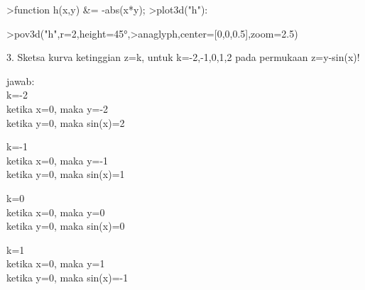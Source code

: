 \documentclass{article}
\begin{document}
\begin{eulernotebook}
\begin{eulercomment}
\begin{eulercomment}
\begin{eulercomment}
\begin{eulercomment}
\begin{eulercomment}
\begin{eulercomment}
\begin{eulerprompt}
\end{eulerprompt}
\begin{eulerprompt}
>function h(x,y) &= -abs(x*y);
>plot3d("h"):
\end{eulerprompt}
\begin{eulerprompt}
>pov3d("h",r=2,height=45°,>anaglyph,center=[0,0,0.5],zoom=2.5)
\end{eulerprompt}
\eulersubheading{}
\begin{eulercomment}
3. Sketsa kurva ketinggian z=k, untuk k=-2,-1,0,1,2 pada  permukaan
z=y-sin(x)!

jawab:\\
k=-2\\
ketika x=0, maka y=-2\\
ketika y=0, maka sin(x)=2

k=-1\\
ketika x=0, maka y=-1\\
ketika y=0, maka sin(x)=1

k=0\\
ketika x=0, maka y=0\\
ketika y=0, maka sin(x)=0

k=1\\
ketika x=0, maka y=1\\
ketika y=0, maka sin(x)=-1


\end{eulercomment}
\end{eulercomment}
\end{eulercomment}
\end{eulercomment}
\end{eulercomment}
\end{eulercomment}
\end{eulercomment}
\end{eulernotebook}
\end{document}
